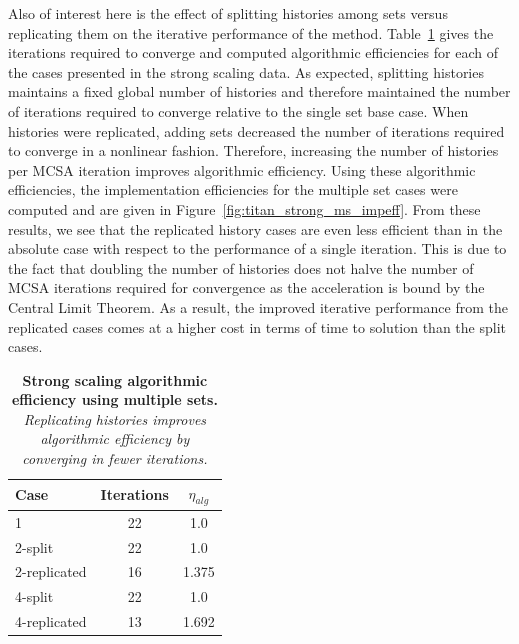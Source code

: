 \documentclass{snamc2013}
\begin{document}
Also of interest here is the effect of splitting histories among sets
versus replicating them on the iterative performance of the
method. Table~\ref{tab:ms_strong_alg_eff} gives the iterations
required to converge and computed algorithmic efficiencies for each of
the cases presented in the strong scaling data. As expected, splitting
histories maintains a fixed global number of histories and therefore
maintained the number of iterations required to converge relative to
the single set base case. When histories were replicated, adding sets
decreased the number of iterations required to converge in a nonlinear
fashion. Therefore, increasing the number of histories per MCSA
iteration improves algorithmic efficiency. Using these algorithmic
efficiencies, the implementation efficiencies for the multiple set
cases were computed and are given in
Figure~\ref{fig:titan_strong_ms_impeff}. From these results, we see
that the replicated history cases are even less efficient than in the
absolute case with respect to the performance of a single
iteration. This is due to the fact that doubling the number of
histories does not halve the number of MCSA iterations required for
convergence as the acceleration is bound by the Central Limit
Theorem. As a result, the improved iterative performance from the
replicated cases comes at a higher cost in terms of time to solution
than the split cases.

\begin{table}[h!]
  \begin{center}
    \begin{tabular}{lcc}\hline\hline
      \multicolumn{1}{l}{Case}& 
      \multicolumn{1}{c}{Iterations}&
      \multicolumn{1}{c}{$\eta_{alg}$} \\\hline
      1 & 22 & 1.0 \\
      2-split & 22 & 1.0 \\
      2-replicated & 16 & 1.375 \\
      4-split & 22 & 1.0 \\
      4-replicated & 13 & 1.692 \\
      \hline\hline
    \end{tabular}
  \end{center}
  \caption{\textbf{Strong scaling algorithmic efficiency using
      multiple sets.} \textit{Replicating histories improves
      algorithmic efficiency by converging in fewer iterations.}}
  \label{tab:ms_strong_alg_eff}
\end{table}
\end{document}
